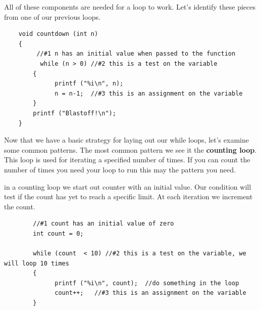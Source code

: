 All of these components are needed for a loop to work. Let's identify these pieces from one of our previous loops. 

\begin{verbatim}
	void countdown (int n) 
	{
		 //#1 n has an initial value when passed to the function
		  while (n > 0) //#2 this is a test on the variable
	 	{
		 	  printf ("%i\n", n);
		 	  n = n-1;  //#3 this is an assignment on the variable
	 	}
	 	printf ("Blastoff!\n");
	}
\end{verbatim}
%
Now that we have a basic strategy for laying out our while loops, let's examine some common patterns. The most common pattern we see it the {\bf counting loop}. This loop is used for iterating a specified number of times. If you can count the number of times you need your loop to run this may the pattern you need.

in a counting loop we start out counter with an initial value. Our condition will test if the count has yet to reach a specific limit. At each iteration we increment the count. 
\begin{verbatim}
		//#1 count has an initial value of zero
		int count = 0;
		
		while (count  < 10) //#2 this is a test on the variable, we will loop 10 times
		{
			  printf ("%i\n", count);  //do something in the loop
			  count++;   //#3 this is an assignment on the variable
		}
\end{verbatim}
%

